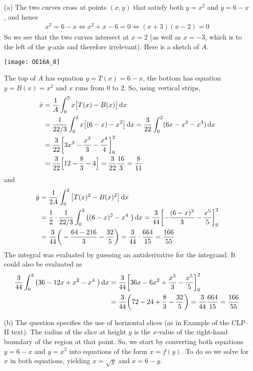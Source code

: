 \begin{solution} (a)
The two curves cross at points $(x,y)$ that satisfy both $y=x^2$ and $y = 6-x$,
and hence
\begin{align*}
x^2 = 6-x
\iff x^2+x-6=0
\iff (x+3)(x-2)=0
\end{align*}
So we see that the two curves intersect at $x=2$ (as well as $x=-3$,
which is to the left of the $y$-axis and therefore irrelevant).
Here is a sketch of $A$.
\begin{center}
   \texttt{[image: OE16A\_8]}
\end{center}
The top of $A$ has equation $y=T(x)=6-x$, the bottom has equation
$y=B(x)=x^2$ and $x$ runs from $0$ to $2$. So, using vertical strips,
\begin{align*}
\bar x &=\frac{1}{A} \int_0^2 x \big[T(x)-B(x)\big]\,\mathrm{d}x  \\
&=   \frac{1}{22/3}
  \int_0^2 x \big[ (6-x) - x^2 \big]\,\mathrm{d}x
       = \frac{3}{22}\int_0^2 (6x-x^2-x^3) \,\mathrm{d}x \\
  &= \frac{3}{22}
    \bigg[ 3x^2 - \frac{x^3}{3} - \frac{x^4}{4} \bigg]_0^2 \\
  &= \frac{3}{22}\Big[12 - \frac{8}{3} - 4\Big]
   = \frac{3}{22} \frac{16}{3}
   =\frac{8}{11}
\end{align*}
and
\begin{align*}
\bar y &=\frac{1}{2A} \int_0^2 \big[T(x)^2-B(x)^2\big]\,\mathrm{d}x  \\
 &= \frac{1}{2}\cdot\frac{1}{22/3}\int_0^2 \big( (6-x)^2 - x^4\ \big) \,\mathrm{d}x
 = \frac{3}{44} \bigg[ {-}\frac{(6-x)^3}{3} - \frac{x^5}{5} \bigg]_0^2 \\
  &=\frac{3}{44} \bigg(-\frac{64-216}{3} - \frac{32}{5} \bigg)
   = \frac{3}{44}\cdot\frac{664}{15}
   =\frac{166}{55}
\end{align*}
The integral was evaluated by guessing an antiderivative for the integrand.
It could also be evaluated as
\begin{align*}
  \frac{3}{44}\int_0^2 \big( 36-12x+x^2 - x^4\ \big) \,\mathrm{d}x
  &= \frac{3}{44} \bigg[36x-6x^2+\frac{x^3}3 - \frac{x^5}5\bigg]_0^2 \\
  &= \frac{3}{44} \bigg( 72-24+\frac83-\frac{32}5 \bigg)
   = \frac{3}{44}\frac{664}{15}
   = \frac{166}{55}
\end{align*}

\noindent (b)
The question specifies the use of horizontal slices (as in Example   of the CLP--II text). The radius of the slice at height $y$ is the $x$-value of the right-hand boundary of the region at that point. So,
we start by converting both equations $y=6-x$ and $y=x^2$ into equations of
the form $x=f(y)$. To do so we solve for $x$ in both equations, yielding $x=\sqrt y$ and $x=6-y$.


\end{solution}
